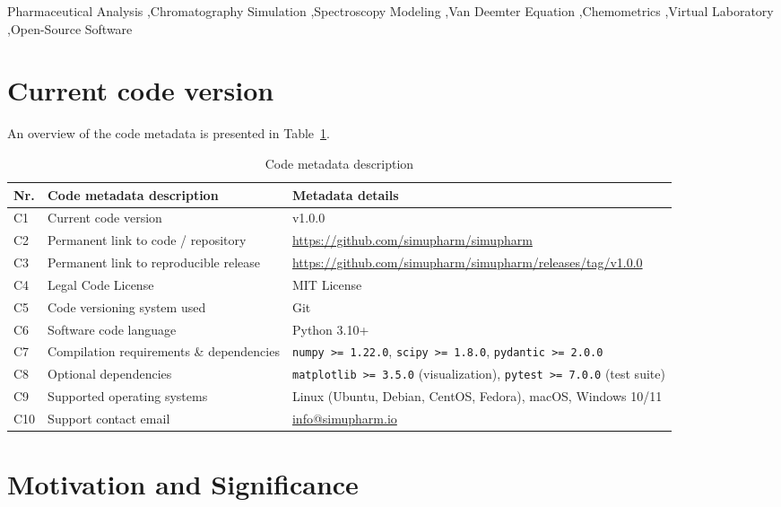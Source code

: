 \documentclass[final,5p,times,twocolumn]{elsarticle}
\begin{document}
\begin{frontmatter}
\begin{keyword}
Pharmaceutical Analysis \sep Chromatography Simulation \sep Spectroscopy Modeling \sep Van Deemter Equation \sep Chemometrics \sep Virtual Laboratory \sep Open-Source Software
\end{keyword}

\end{frontmatter}

\section*{Current code version}
An overview of the code metadata is presented in Table~\ref{tab:metadata}.

\begin{table}[t]
\caption{Code metadata description}
\label{tab:metadata}
\small
\begin{tabularx}{\textwidth}{l p{5.5cm} X}
\toprule
\textbf{Nr.} & \textbf{Code metadata description} & \textbf{Metadata details} \\
\midrule
C1 & Current code version & v1.0.0 \\
C2 & Permanent link to code / repository & \url{https://github.com/simupharm/simupharm} \\
C3 & Permanent link to reproducible release & \url{https://github.com/simupharm/simupharm/releases/tag/v1.0.0} \\
C4 & Legal Code License & MIT License \\
C5 & Code versioning system used & Git \\
C6 & Software code language & Python 3.10+ \\
C7 & Compilation requirements \& dependencies & \texttt{numpy >= 1.22.0}, \texttt{scipy >= 1.8.0}, \texttt{pydantic >= 2.0.0} \\
C8 & Optional dependencies & \texttt{matplotlib >= 3.5.0} (visualization), \texttt{pytest >= 7.0.0} (test suite) \\
C9 & Supported operating systems & Linux (Ubuntu, Debian, CentOS, Fedora), macOS, Windows 10/11 \\
C10 & Support contact email & \url{info@simupharm.io} \\
\bottomrule
\end{tabularx}
\end{table}

\section{Motivation and Significance}
\label{sec:motivation}
\end{document}
